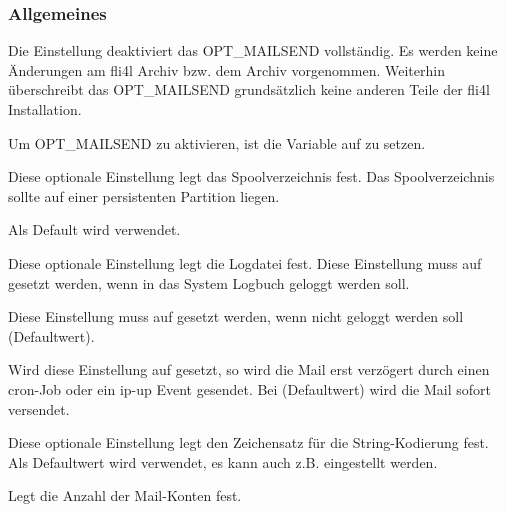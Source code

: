 \subsubsection {Allgemeines}
\begin{description}


    Die Einstellung  deaktiviert das OPT\_MAILSEND vollständig.
    Es werden keine Änderungen am fli4l Archiv  bzw. 
    dem Archiv  vorgenommen. 
    Weiterhin überschreibt das OPT\_MAILSEND grundsätzlich keine anderen
    Teile der fli4l Installation.
    
    Um OPT\_MAILSEND zu aktivieren, ist die Variable  auf
     zu setzen.

    
    Diese optionale Einstellung legt das Spoolverzeichnis fest.
    Das Spoolverzeichnis sollte auf einer persistenten Partition liegen.
    
    Als Default wird  verwendet.
     

    Diese optionale Einstellung legt die Logdatei fest.
    Diese Einstellung muss auf  gesetzt werden, wenn in
    das System Logbuch geloggt werden soll. 
    
    Diese Einstellung muss auf  gesetzt werden, wenn nicht geloggt 
    werden soll (Defaultwert).  

    
    Wird diese Einstellung auf  gesetzt, so wird die Mail 
    erst verzögert durch einen cron-Job oder ein ip-up Event gesendet.
    Bei  (Defaultwert) wird die Mail sofort versendet.
    
    
    Diese optionale Einstellung legt den Zeichensatz für die String-Kodierung
    fest. Als Defaultwert wird  verwendet, es kann auch z.B. 
     eingestellt werden. 
                                
  
  Legt die Anzahl der Mail-Konten fest. 

\end{description}

